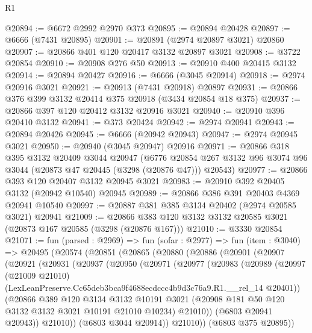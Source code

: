 \begin{lexlean}{R1}
\begin{coremodule}
@20894 := @6672 @2992 @2970 @373
@20895 := @20894 @20428
@20897 := @6666 (@7431 @20895)
@20901 := @20891 (@2974 @20897 @3021) @20860
@20907 := @20866 @401 @120 @20417 @3132 @20897 @3021
@20908 := @3722 @20854
@20910 := @20908 @276 @50
@20913 := @20910 @400 @20415 @3132
@20914 := @20894 @20427
@20916 := @6666 (@3045 @20914)
@20918 := @2974 @20916 @3021
@20921 := @20913 (@7431 @20918) @20897
@20931 := @20866 @376 @399 @3132 @20414 @375 @20918 (@3434 @20854 @18 @375)
@20937 := @20866 @397 @120 @20412 @3132 @20916 @3021
@20940 := @20910 @396 @20410 @3132
@20941 := @373 @20424
@20942 := @2974 @20941
@20943 := @20894 @20426
@20945 := @6666 (@20942 @20943)
@20947 := @2974 @20945 @3021
@20950 := @20940 (@3045 @20947) @20916
@20971 := @20866
    @318
    @395
    @3132
    @20409
    @3044
    @20947
    (@6776 @20854 @267 @3132 @96 @3074 @96 @3044 (@20873 @47 @20445 (@3298 (@20876 @47))) @20543)
@20977 := @20866 @393 @120 @20407 @3132 @20945 @3021
@20983 := @20910 @392 @20405 @3132 (@20942 @10540) @20945
@20989 := @20866 @386 @391 @20403 @4369 @20941 @10540
@20997 := @20887 @381 @385 @3134 @20402 (@2974 @20585 @3021) @20941
@21009 := @20866 @383 @120 @3132 @3132 @20585 @3021 (@20873 @167 @20585 (@3298 (@20876 @167)))
@21010 := @3330 @20854
@21071 := fun (parsed : @2969) =>
  fun (sofar : @2977) =>
  fun (item : @3040) =>
  @20495
    (@20574
      (@20851
        (@20865
          (@20880
            (@20886
              (@20901
                (@20907
                  (@20921
                    (@20931
                      (@20937
                        (@20950
                          (@20971
                            (@20977
                              (@20983
                                (@20989
                                  (@20997
                                    (@21009 @21010)
                                    (LexLeanPreserve.Cc65deb3bca9f4688ecdccc4b9d3c76a9.R1.__rel_14
                                      @20401))
                                  (@20866
                                    @389
                                    @120
                                    @3134
                                    @3132
                                    @10191
                                    @3021
                                    (@20908 @181 @50 @120 @3132 @3132 @3021 @10191 @21010 @10234)
                                    @21010))
                                (@6803 @20941 @20943))
                              @21010))
                          (@6803 @3044 @20914))
                        @21010))
                    (@6803 @375 @20895))

\end{coremodule}
\end{lexlean}
